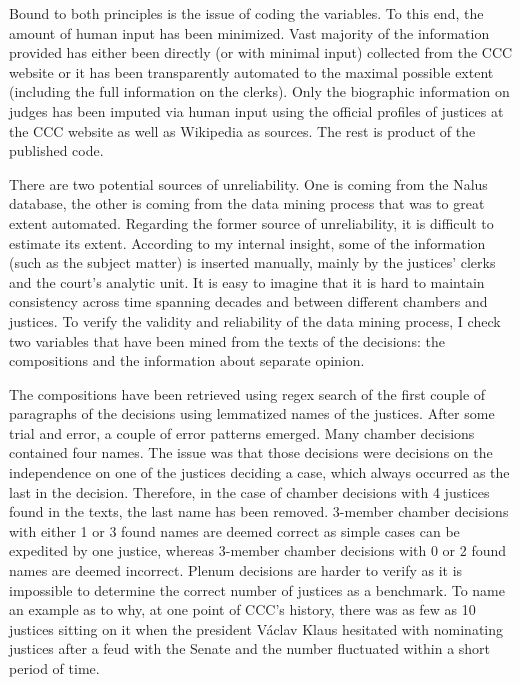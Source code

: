 \documentclass[
  11pt,
]{article}
\begin{document}
Bound to both principles is the issue of coding the variables. To this end, the amount of human input has been minimized. Vast majority of the information provided has either been directly (or with minimal input) collected from the CCC website or it has been transparently automated to the maximal possible extent (including the full information on the clerks). Only the biographic information on judges has been imputed via human input using the official profiles of justices at the CCC website as well as Wikipedia as sources. The rest is product of the published code.

There are two potential sources of unreliability. One is coming from the Nalus database, the other is coming from the data mining process that was to great extent automated. Regarding the former source of unreliability, it is difficult to estimate its extent. According to my internal insight, some of the information (such as the subject matter) is inserted manually, mainly by the justices' clerks and the court's analytic unit. It is easy to imagine that it is hard to maintain consistency across time spanning decades and between different chambers and justices. To verify the validity and reliability of the data mining process, I check two variables that have been mined from the texts of the decisions: the compositions and the information about separate opinion.

The compositions have been retrieved using regex search of the first couple of paragraphs of the decisions using lemmatized names of the justices. After some trial and error, a couple of error patterns emerged. Many chamber decisions contained four names. The issue was that those decisions were decisions on the independence on one of the justices deciding a case, which always occurred as the last in the decision. Therefore, in the case of chamber decisions with 4 justices found in the texts, the last name has been removed. 3-member chamber decisions with either 1 or 3 found names are deemed correct as simple cases can be expedited by one justice, whereas 3-member chamber decisions with 0 or 2 found names are deemed incorrect. Plenum decisions are harder to verify as it is impossible to determine the correct number of justices as a benchmark. To name an example as to why, at one point of CCC's history, there was as few as 10 justices sitting on it when the president Václav Klaus hesitated with nominating justices after a feud with the Senate and the number fluctuated within a short period of time.
\end{document}
